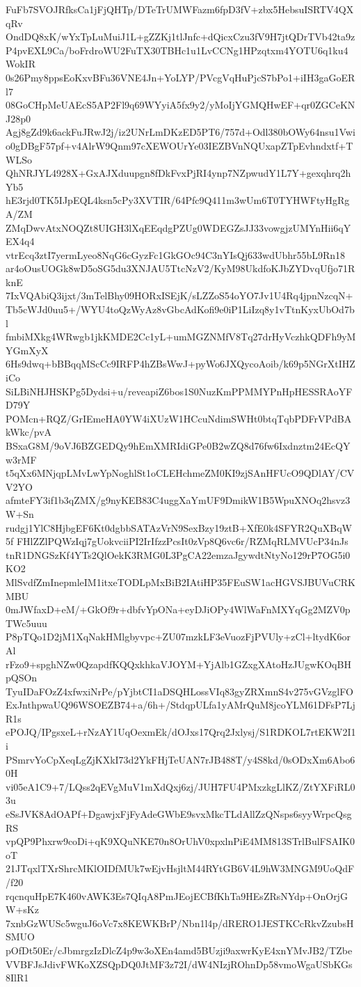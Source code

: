 FuFb7SVOJRfksCa1jFjQHTp/DTeTrUMWFazm6fpD3fV+zbx5HebsuISRTV4QXqRv
OndDQ8xK/wYxTpLuMuiJ1L+gZZKj1tlJnfc+dQicxCzu3fV9H7jtQDrTVb42ta9z
P4pvEXL9Ca/boFrdroWU2FuTX30TBHc1u1LvCCNg1HPzqtxm4YOTU6q1ku4WokIR
0s26Pmy8ppsEoKxvBFu36VNE4Jn+YoLYP/PVcgVqHuPjcS7bPo1+iIH3gaGoERl7
08GoCHpMeUAEcS5AP2Fl9q69WYyiA5fx9y2/yMoIjYGMQHwEF+qr0ZGCeKNJ28p0
Agj8gZd9k6ackFuJRwJ2j/iz2UNrLmDKzED5PT6/757d+Odl380bOWy64nsu1Vwi
o0gDBgF57pf+v4AlrW9Qnm97cXEWOUrYe03IEZBVnNQUxapZTpEvhndxtf+TWLSo
QhNRJYL4928X+GxAJXduupgn8fDkFvxPjRI4ynp7NZpwudY1L7Y+gexqhrq2hYb5
hE3rjd0TK5IJpEQL4ksn5cPy3XVTIR/64Pfc9Q411m3wUm6T0TYHWFtyHgRgA/ZM
ZMqDwvAtxNOQZt8UIGH3lXqEEqdgPZUg0WDEGZsJJ33vowgjzUMYnHii6qYEX4q4
vtrEcq3ztI7yermLyeo8NqG6cGyzFc1GkGOc94C3nYIsQj633wdUbhr55bL9Rn18
ar4oOusUOGk8wD5oSG5du3XNJAU5TtcNzV2/KyM98UkdfoKJbZYDvqUfjo71RknE
7IxVQAbiQ3ijxt/3mTelBhy09HORxISEjK/sLZZoS54oYO7Jv1U4Rq4jpnNzcqN+
Tb5cWJd0uu5+/WYU4toQzWyAz8vGbcAdKofi9e0iP1LiIzq8y1vTtnKyxUbOd7bl
fmbiMXkg4WRwgb1jkKMDE2Cc1yL+umMGZNMfV8Tq27drHyVczhkQDFh9yMYGmXyX
6Hs9dwq+bBBqqMScCc9IRFP4hZBsWwJ+pyWo6JXQycoAoib/k69p5NGrXtIHZiCo
SiLBiNHJHSKPg5Dydsi+u/reveapiZ6bos1S0NuzKmPPMMYPnHpHESSRAoYFD79Y
POMcn+RQZ/GrIEmeHA0YW4iXUzW1HCcuNdimSWHt0btqTqbPDFrVPdBAkWkc/pvA
BSxaG8M/9oVJ6BZGEDQy9hEmXMRIdiGPe0B2wZQ8d76fw6Ixdnztm24EcQYw3rMF
t5qXx6MNjqpLMvLwYpNoghlSt1oCLEHchmeZM0KI9zjSAnHFUcO9QDlAY/CVV2YO
afmteFY3if1b3qZMX/g9nyKEB83C4uggXaYmUF9DmikW1B5WpuXNOq2hsvz3W+Sn
rudgj1YlC8HjbgEF6Kt0dgbbSATAzVrN9SexBzy19ztB+XfE0k4SFYR2QuXBqW5f
FHlZZlPQWzIqj7gUokvciiPI2IrIfzzPcsIt0zVp8Q6vc6r/RZMqRLMVUcP34nJs
tnR1DNGSzKf4YTs2QlOekK3RMG0L3PgCA22emzaJgywdtNtyNo129rP7OG5i0KO2
MlSvdfZmInepmleIM1itxeTODLpMxBiB2IAtiHP35FEuSW1acHGVSJBUVuCRKMBU
0mJWfaxD+eM/+GkOf9r+dbfvYpONa+eyDJiOPy4WlWaFnMXYqGg2MZV0pTWc5uuu
P8pTQo1D2jM1XqNakHMlgbyvpc+ZU07mzkLF3eVuozFjPVUly+zCl+ltydK6orAl
rFzo9+spghNZw0QzapdfKQQxkhkaVJOYM+YjAlb1GZxgXAtoHzJUgwKOqBHpQSOn
TyuIDaFOzZ4xfwxiNrPe/pYjbtCI1aDSQHLossVIq83gyZRXmnS4v275vGVzglFO
ExJnthpwaUQ96WSOEZB74+a/6h+/StdqpULfa1yAMrQuM8jcoYLM61DFsP7LjR1s
ePOJQ/IPgsxeL+rNzAY1UqOexmEk/dOJxs17Qrq2Jxlysj/S1RDKOL7rtEKW2I1i
PSmrvYoCpXeqLgZjKXkI73d2YkFHjTeUAN7rJB488T/y4S8kd/0sODxXm6Abo60H
vi05eA1C9+7/LQss2qEVgMuV1mXdQxj6zj/JUH7FU4PMxzkgLlKZ/ZtYXFiRL03u
eSsJVK8AdOAPf+DgawjxFjFyAdeGWbE9svxMkcTLdAllZzQNsps6syyWrpcQsgRS
vpQP9Phxrw9coDi+qK9XQuNKE70n8OrUhV0xpxlnPiE4MM813STrlBulFSAIK0oT
21JTqxlTXrShrcMKlOIDfMUk7wEjvHsjltM44RYtGB6V4L9hW3MNGM9UoQdF/f20
rqcnquHpE7K460vAWK3Es7QIqA8PmJEojECBfKhTa9HEsZRsNYdp+OnOrjGW+sKz
7xnbGzWUSc5wguJ6oVc7x8KEWKBrP/Nbn1l4p/dRERO1JESTKCcRkvZzubsHSMUO
pOfDt50Er/cJbmrgzIzDlcZ4p9w3oXEn4amd5BUzji9axwrKyE4xnYMvJB2/TZbe
VVBFJsJdivFWKoXZSQpDQ0JtMF3z72I/dW4NIzjROhnDp58vmoWgaUSbKGs8IlR1
